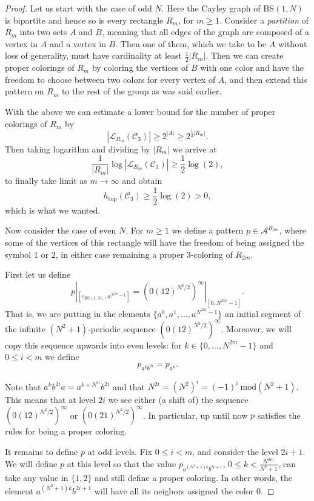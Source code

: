 \documentclass[cupthm,crop,info]{CUP-JNL-ETS}%
\theoremstyle{cupplain}
\theoremstyle{cupdefinition}
\theoremstyle{cupremark}
\theoremstyle{cupproof}
\newtheorem{proof}{Proof}
\numberwithin{equation}{section}
\newcommand{\BS}[1][N]{\mathrm{BS}(1,#1)}
\def\htop{h_{\mathrm{top}}}
\begin{document}
\begin{proof}
	Let us start with the case of odd $N$. Here the Cayley graph of $\BS$ is bipartite and hence so is every rectangle $R_m$, for $m\ge 1$. Consider a \textit{partition} of $R_m$ into two sets $A$ and $B$, meaning that all edges of the graph are composed of a vertex in $A$ and a vertex in $B$. Then one of them, which we take to be $A$ without loss of generality, must have cardinality at least $\frac{1}{2}|R_m|$. Then we can create proper colorings of $R_m$ by coloring the vertices of $B$ with one color and have the freedom to choose between two colors for every vertex of $A$, and then extend this pattern on $R_m$ to the rest of the group as was said earlier.
	
	With the above we can estimate a lower bound for the number of proper colorings of $R_m$ by
	$$
	|\mathcal{L}_{R_m}(\mathcal{C}_3)|\ge 2^{|A|}\ge 2^{\frac{1}{2}|R_m|}.
	$$
	Then taking logarithm and dividing by $|R_m|$ we arrive at
	$$
	\frac{1}{|R_m|}\log |\mathcal{L}_{R_m}(\mathcal{C}_3)| \ge \frac{1}{2}\log (2),
	$$
	to finally take limit as $m\to \infty$ and obtain
	$$
	\htop(\mathcal{C}_3)\ge \frac{1}{2}\log(2)>0,
	$$
	which is what we wanted.
	
	
	Now consider the case of even $N$. For $m\ge 1$ we define a pattern $p\in \mathcal{A}^{R_{2m}}$, where some of the vertices of this rectangle will have the freedom of being assigned the symbol $1$ or $2$, in either case remaining a proper $3$-coloring of $R_{2m}$.
	
	First let us define 
	$$
	p|_{[e_{\BS},a^{N^{2m}-1}]}=(0(12)^{N^2/2})^{\infty}|_{[0,N^{2m}-1]}.
	$$
	That is, we are putting in the elements $\{a^{0},a^{1},\ldots,a^{N^{2m}-1}\}$ an initial segment of the infinite $(N^2+1)$-periodic sequence $\left(0(12)^{N^2/2}\right)^{\infty}$. Moreover, we will copy this sequence upwards into even levels: for $k\in \{0,\ldots,N^{2m}-1\}$ and $0\le i<m$ we define
	$$
	p_{a^{k}b^{2i}}=p_{a^k}.
	$$
	
	Note that $a^kb^{2i}a=a^{k+N^{2i}}b^{2i}$ and that $N^{2i}=(N^{2})^i=(-1)^{i}\ \mathrm{mod}(N^2+1)$. This means that at level $2i$ we see either (a shift of) the sequence $(0(12)^{N^2/2})^{\infty}$ or $(0(21)^{N^2/2})^{\infty}$. In particular, up until now $p$ satisfies the rules for being a proper coloring.
	
	It remains to define $p$ at odd levels. Fix $0\le i<m$, and consider the level $2i+1$. We will define $p$ at this level so that the value $p_{a^{(N^2+1)k}b^{2i+1}}$, $0\le k<\frac{N^{2m}}{N^2+1}$, can take any value in $\{1,2\}$ and still define a proper coloring. In other words, the element $a^{(N^2+1)k}b^{2i+1}$ will have all its neigbors assigned the color $0$.
	

\end{proof}
\end{document}
